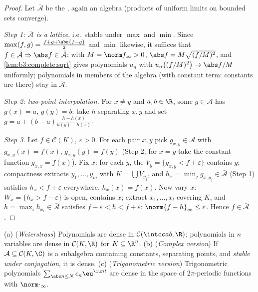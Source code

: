 \begin{proof}
Let $\bar{\mathcal A}$ be the , again an algebra
(products of uniform limits on bounded sets converge).

\emph{Step 1: $\bar{\mathcal A}$ is a lattice}, i.e.\ stable
under $\max$ and $\min$. Since $\max(f,g) = \frac{f + g +
\abs{f-g}}2$ and $\min$ likewise, it suffices that $f \in
\bar{\mathcal A} \Rightarrow \abs f \in \bar{\mathcal A}$: with
$M = \norm f_\infty > 0$, $\abs f = M\sqrt{(f/M)^2}$, and
\cref{lem:b3:complete:sqrt} gives polynomials $u_n$ with
$u_n\bigl((f/M)^2\bigr) \to \abs f/M$ uniformly; polynomials in
members of the algebra (with constant term: constants are
there) stay in $\bar{\mathcal A}$.

\emph{Step 2: two-point interpolation.} For $x \neq y$ and $a,
b \in \R$, some $g \in \mathcal A$ has $g(x) = a$, $g(y) = b$:
take $h$ separating $x, y$ and set $g = a + (b -
a)\frac{h - h(x)}{h(y) - h(x)}$.

\emph{Step 3.} Let $f \in \mathcal C(K)$, $\varepsilon > 0$.
For each pair $x, y$ pick $g_{x,y} \in \mathcal A$ with
$g_{x,y}(x) = f(x)$, $g_{x,y}(y) = f(y)$ (Step 2; for $x = y$
take the constant function $g_{x,x} = f(x)$).
Fix $x$: for each $y$, the  $V_y = \{g_{x,y} < f +
\varepsilon\}$ contains $y$; compactness extracts $y_1, \dots,
y_m$ with $K = \bigcup V_{y_j}$, and $h_x = \min_j g_{x, y_j}
\in \bar{\mathcal A}$ (Step 1) satisfies $h_x < f +
\varepsilon$ everywhere, $h_x(x) = f(x)$. Now vary $x$: $W_x =
\{h_x > f - \varepsilon\}$ is open, contains $x$; extract $x_1,
\dots, x_l$ covering $K$, and $h = \max_i h_{x_i} \in
\bar{\mathcal A}$ satisfies $f - \varepsilon < h < f +
\varepsilon$: $\norm{f - h}_\infty \leq \varepsilon$. Hence
$f \in \bar{\mathcal A}$.
\end{proof}

\begin{corollary}\label{cor:b3:complete:weierstrass}
(a) (\emph{Weierstrass}) Polynomials are dense in $\mathcal
C(\intcc ab, \R)$; polynomials in $n$ variables are dense in
$\mathcal C(K, \R)$ for  $K \subseteq \R^n$.
(b) (\emph{Complex version}) If $\mathcal A \subseteq \mathcal
C(K, \C)$ is a subalgebra containing constants, separating
points, and \emph{stable under conjugation}, it is dense.
(c) (\emph{Trigonometric version}) Trigonometric polynomials
$\sum_{\abs n \leq N}c_n\eu^{\iu n t}$ are dense in the space of
 $2\pi$-periodic functions with
$\norm\cdot_\infty$.
\end{corollary}


